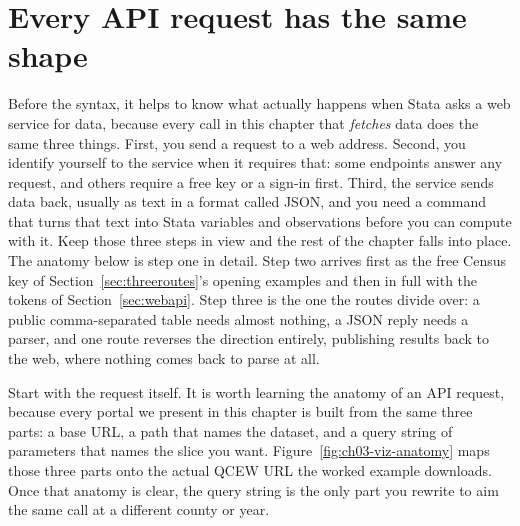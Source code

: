 \documentclass[
    a4paper,
    fontsize=10pt,
    twoside=true,
    numbers=noenddot,
]{kaobook}
\begin{document}
\section{Every API request has the same shape}\label{ch03-sc-shape}
Before the syntax, it helps to know what actually happens when Stata asks a web service for data, because every call in this chapter that \emph{fetches} data does the same three things. First, you send a request to a web address. Second, you identify yourself to the service when it requires that: some endpoints answer any request, and others require a free key or a sign-in first. Third, the service sends data back, usually as text in a format called JSON, and you need a command that turns that text into Stata variables and observations before you can compute with it. Keep those three steps in view and the rest of the chapter falls into place. The anatomy below is step one in detail. Step two arrives first as the free Census key of Section~\ref{sec:threeroutes}'s opening examples and then in full with the tokens of Section~\ref{sec:webapi}. Step three is the one the routes divide over: a public comma-separated table needs almost nothing, a JSON reply needs a parser, and one route reverses the direction entirely, publishing results back to the web, where nothing comes back to parse at all.

Start with the request itself. It is worth learning the anatomy of an API request, because every portal we present in this chapter is built from the same three parts: a base URL, a path that names the dataset, and a query string of parameters that names the slice you want. Figure~\ref{fig:ch03-viz-anatomy} maps those three parts onto the actual QCEW URL the worked example downloads. Once that anatomy is clear, the query string is the only part you rewrite to aim the same call at a different county or year.
\end{document}
